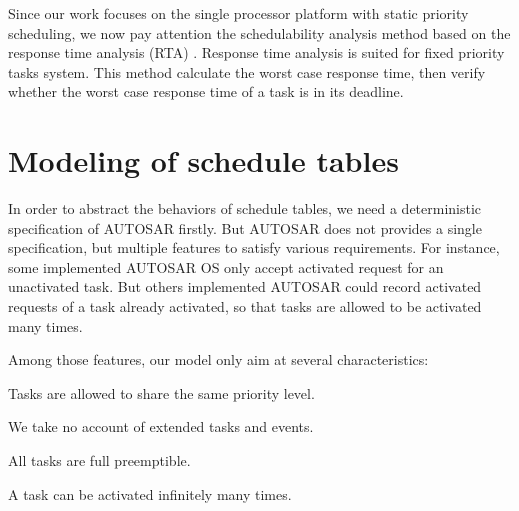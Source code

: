\documentclass[10pt,conference]{IEEEtran}
\begin{document}
Since our work focuses on the single processor platform with static priority scheduling, we now pay attention the schedulability analysis method based on the response time analysis (RTA) \cite{DBLP:journals/iee/AudsleyBRTW93}. Response time analysis is suited for fixed priority tasks system. This method calculate the worst case response time, then verify whether the worst case response time of a task is in its deadline. 

\section{Modeling of schedule tables}

In order to abstract the behaviors of schedule tables, we need a deterministic specification of AUTOSAR firstly. But AUTOSAR does not provides a single specification, but multiple features to satisfy various requirements. For instance, some implemented AUTOSAR OS only accept activated request for an unactivated task. But others implemented AUTOSAR could record activated requests of a task already activated, so that tasks are allowed to be activated many times.

Among those features, our model only aim at several characteristics: 
\begin{compactitem}
  \item Tasks are allowed to share the same priority level.
  \item We take no account of extended tasks and events.
  \item All tasks are full preemptible.
  \item A task can be activated infinitely many times.
\end{compactitem}
\end{document}
